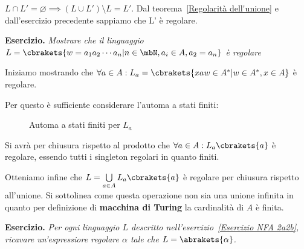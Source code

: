 \(L\cap L' = \varnothing \implies (L \cup L') \setminus L = L'\). Dal teorema~\ref{Regolarità dell'unione} e dall'esercizio precedente sappiamo che L' è regolare.

\textbf{Esercizio. } \textit{Mostrare che il linguaggio \(L=\cbrakets{w=a_1a_2\cdots a_n \vert n \in \mbN, a_i \in A, a_2=a_n}\) è regolare}

Iniziamo mostrando che \(\forall a \in A: L_a=\cbrakets{xaw \in A^* \vert w \in A^*, x \in A}\) è regolare.

Per questo è sufficiente considerare l'automa a stati finiti:

\begin{figure}[ht]
    \centering
        \caption{Automa a stati finiti per \(L_a\)}\label{Automa L_a}
\end{figure}

Si avrà per chiusura rispetto al prodotto che \(\forall a \in A: L_a\cbrakets{a}\) è regolare, essendo tutti i singleton regolari in quanto finiti.

Otteniamo infine che \(L= \bigcup\limits_{a \in A} L_a\cbrakets{a}\) è regolare per chiusura rispetto all'unione. Si sottolinea come questa operazione non sia una unione infinita in quanto per definizione di \textbf{macchina di Turing} la cardinalità di \(A\) è finita.

\textbf{Esercizio. } \textit{Per ogni linguaggio \(L\) descritto nell'esercizio~\ref{Esercizio NFA 2a2b}, ricavare un'espressiore regolare \(\alpha\) tale che \(L = \abrakets{\alpha}\).} %

